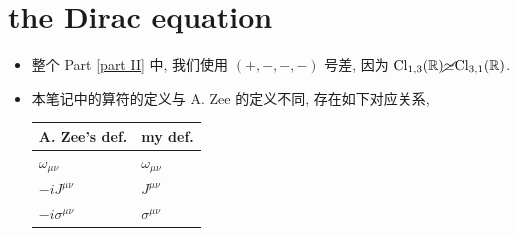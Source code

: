 \chapter{the Dirac equation}
\begin{itemize}
	\item 整个 Part \ref{part II} 中, 我们使用 $(+, -, -, -)$ 号差, 因为 $\mathrm{Cl}_{1, 3}(\mathbb{R}) \cancel{\simeq} \mathrm{Cl}_{3, 1}(\mathbb{R})$.
	
	\item 本笔记中的算符的定义与 A. Zee 的定义不同, 存在如下对应关系,
	
	\begin{center}
		\begin{tabularx}{\linewidth}{KK}
			\toprule 
			A. Zee's def. & my def. \\
			\midrule 
			$\omega_{\mu \nu}$ & $\omega_{\mu \nu}$ \\
			$- i J^{\mu \nu}$ & $J^{\mu \nu}$ \\
			$- i \sigma^{\mu \nu}$ & $\sigma^{\mu \nu}$ \\
			\bottomrule
		\end{tabularx}
	\end{center}
\end{itemize}

